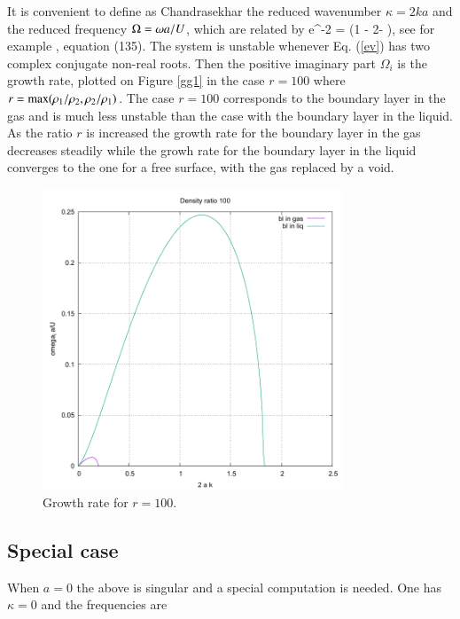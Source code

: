It is convenient to define
as Chandrasekhar \cite{Chandrasekhar} the reduced wavenumber  $\kappa = 2ka$
and the reduced frequency $\Omega={\omega} a/U$, which are related by 
\be
e^{-2\kappa} 
=  (1 - 2\Omega - \kappa),
\label{ev}
\nd
see for example \cite{Eggers08}, equation (135).
The system is unstable whenever Eq. (\ref{ev}) has two complex conjugate non-real roots. Then the positive
imaginary part 
$\Omega_i$ is the growth rate, plotted on Figure \ref{gg1} in the case $r=100$
where $r={\rm max}(\rho_1/\rho_2,\rho_2/\rho_1)$.
The case $r=100$ corresponds to the boundary layer in the gas
and is much less unstable than the case with the boundary layer in the liquid. As the ratio $r$ is increased
the growth rate for the boundary layer in the gas decreases steadily while the growh rate for the boundary layer in the liquid converges to the one for a free surface, with the gas replaced by a void. 
\begin{figure}
\includegraphics[width=0.8\textwidth]{Figures/rrates_100.pdf}
\caption{Growth rate for $r=100$.  \label{khappfig} }
\end{figure}

\subsection{Special case}

When $a=0$ the above is singular and a special computation
is needed. One has $\kappa=0$ and the frequencies are

